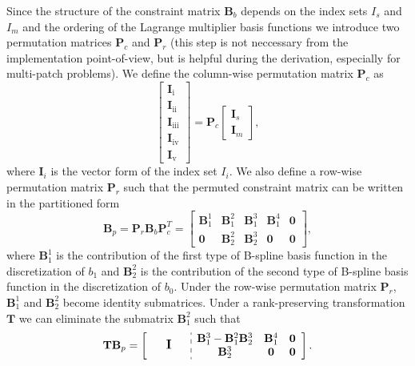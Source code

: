 Since the structure of the constraint matrix $\mathbf{B}_b$ depends on the index sets $I_s$ and $I_m$ and the ordering of the Lagrange multiplier basis functions we introduce two permutation matrices $\mathbf{P}_c$ and $\mathbf{P}_r$ (this step is not neccessary from the implementation point-of-view, but is helpful during the derivation, especially for multi-patch problems). We define the column-wise permutation matrix $\mathbf{P}_c$ as
\begin{equation}
  \begin{bmatrix}
    \mathbf{I}_\text{i}   \\
    \mathbf{I}_\text{ii}  \\
    \mathbf{I}_\text{iii} \\
    \mathbf{I}_\text{iv}  \\
    \mathbf{I}_\text{v}
  \end{bmatrix}=
  \mathbf{P}_c
  \begin{bmatrix}
    \mathbf{I}_s \\
    \mathbf{I}_m
  \end{bmatrix},
\end{equation}
where $\mathbf{I}_i$ is the vector form of the index set  $I_i$. We also define a row-wise permutation matrix $\mathbf{P}_r$ such that the permuted constraint matrix can be written in the partitioned form
\begin{equation}
  \mathbf{B}_p=\mathbf{P}_r\mathbf{B}_b\mathbf{P}_c^T=
  \begin{bmatrix}
    \mathbf{B}_1^1 & \mathbf{B}_1^2 & \mathbf{B}_1^3 & \mathbf{B}_1^4 & \mathbf{0} \\
    \mathbf{0}     & \mathbf{B}_2^2 & \mathbf{B}_2^3 & \mathbf{0}     & \mathbf{0}
  \end{bmatrix},
\end{equation}
where $\mathbf{B}_1^1$ is the contribution of the first type of B-spline basis function in the discretization of $b_1$ and $\mathbf{B}_2^2$ is the contribution of the second type of B-spline basis function in the discretization of $b_0$. Under the row-wise permutation matrix $\mathbf{P}_r$, $\mathbf{B}_1^1$ and $\mathbf{B}_2^2$ become identity submatrices. Under a rank-preserving transformation $\mathbf{T}$ we can eliminate the submatrix $\mathbf{B}_1^2$ such that
\begin{equation}
  \sbox0{$\begin{matrix}\mathbf{B}_1^3-\mathbf{B}_1^2\mathbf{B}_2^3 & \mathbf{B}_1^4 & \mathbf{0} \\ \mathbf{B}_2^3 & \mathbf{0} & \mathbf{0}\end{matrix}$}
  \mathbf{T}\mathbf{B}_p=\left[
    \begin{array}{c:c}
      \makebox[\wd0/3]{\large $\mathbf{I}$} & \usebox{0} \\
    \end{array}
    \right].\label{eq:simple_form}
\end{equation}
